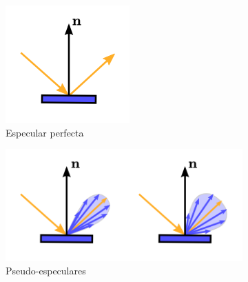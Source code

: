 \begin{figure}[!h]
    \centering
    \begin{subfigure}[b]{0.25\textwidth}
        \centering
        \includegraphics[width=\textwidth]{Plantilla-TFG-master/img/glossyTodiffuse1.png}
        \caption{Especular perfecta}
    \end{subfigure}
    \hfill
    \begin{subfigure}[b]{0.48\textwidth}
        \centering
        \includegraphics[width=\textwidth]{Plantilla-TFG-master/img/glossyTodiffuse2.png}
        \caption{Pseudo-especulares}
    \end{subfigure}
    \hfill
    \begin{subfigure}[b]{0.20\textwidth}
        \centering

\end{subfigure}
\end{figure}
